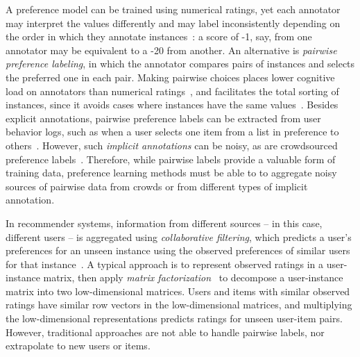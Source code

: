 A preference model can be trained using numerical ratings, yet 
each annotator may interpret the values differently and may label inconsistently depending on the order in which they annotate instances~\citep{ovadia2004ratings,yannakakis2011ranking}: 
a score of -1, say, from one annotator may be equivalent to a -20 from another. 
An alternative is \emph{pairwise preference labeling}, 
in which the annotator compares pairs of instances and selects the preferred one in each pair.
Making pairwise choices places lower cognitive load on annotators than numerical ratings~\citep{yang2011ranking},
and facilitates the total sorting of instances, since it avoids cases where instances have the same values~\citep{kendall1948rank,kingsley2010preference}.
Besides explicit annotations, pairwise preference labels can be extracted from
user behavior logs, such as when a user selects one item from a list in preference
to others~\citep{joachims2002optimizing}. 
However, such \emph{implicit annotations} can be noisy, as are crowdsourced preference labels~\citep{habernal2016argument}.
Therefore, while pairwise labels provide a valuable
form of training data, preference learning methods must be able to 
to aggregate noisy sources of pairwise data from crowds 
or from different types of implicit annotation.

In recommender systems, information from different sources -- in this case, different users --
 is aggregated using \emph{collaborative filtering},  
which predicts a user's preferences for an unseen instance using the observed preferences of 
similar users for that instance~\citep{resnick1997recommender}.
A typical approach is to represent observed ratings in a user-instance matrix,
then apply \emph{matrix factorization}~\citep{koren2009matrix}
to decompose a user-instance matrix into two low-dimensional matrices.
Users and items with similar observed ratings have similar row vectors in the low-dimensional
matrices, and multiplying the low-dimensional representations predicts ratings for unseen
user-item pairs. 
However, traditional approaches are not able to handle pairwise labels,
nor extrapolate to new users or items.


